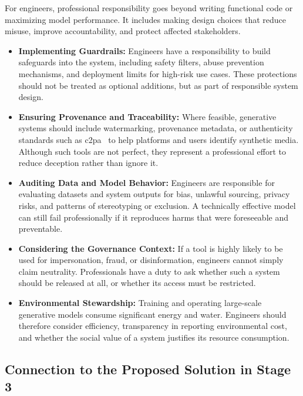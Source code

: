 For engineers, professional responsibility goes beyond writing functional code or maximizing model performance. It includes making design choices that reduce misuse, improve accountability, and protect affected stakeholders.

\begin{itemize}
    \item \textbf{Implementing Guardrails:} Engineers have a responsibility to build safeguards into the system, including safety filters, abuse prevention mechanisms, and deployment limits for high-risk use cases. These protections should not be treated as optional additions, but as part of responsible system design.

    \item \textbf{Ensuring Provenance and Traceability:} Where feasible, generative systems should include watermarking, provenance metadata, or authenticity standards such as \ac{c2pa}~\cite{c2pa} to help platforms and users identify synthetic media. Although such tools are not perfect, they represent a professional effort to reduce deception rather than ignore it.

    \item \textbf{Auditing Data and Model Behavior:} Engineers are responsible for evaluating datasets and system outputs for bias, unlawful sourcing, privacy risks, and patterns of stereotyping or exclusion. A technically effective model can still fail professionally if it reproduces harms that were foreseeable and preventable.

    \item \textbf{Considering the Governance Context:} If a tool is highly likely to be used for impersonation, fraud, or disinformation, engineers cannot simply claim neutrality. Professionals have a duty to ask whether such a system should be released at all, or whether its access must be restricted.

    \item \textbf{Environmental Stewardship:} Training and operating large-scale generative models consume significant energy and water. Engineers should therefore consider efficiency, transparency in reporting environmental cost, and whether the social value of a system justifies its resource consumption.
\end{itemize}

\subsection{Connection to the Proposed Solution in Stage 3}\label{sec:ethics-solution-link}

